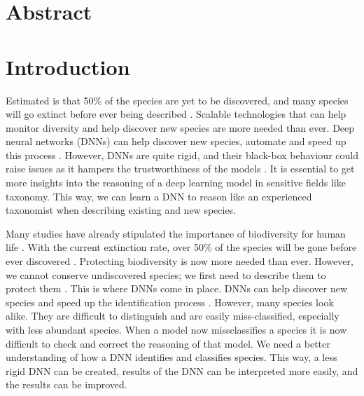 \documentclass[a4paper, 12pt, oneside]{book} %
\begin{document}
\newpage
\thispagestyle{empty}
\section*{Abstract}

\glsaddall\printglossary[type=\acronymtype]\printglossary


\thispagestyle{empty}
\tableofcontents
\thispagestyle{empty}
\listoffigures
\thispagestyle{empty}
\listoftables
\thispagestyle{empty}
\newpage



\renewcommand{\thesection}{\arabic{section}}
\section{Introduction}

Estimated is that 50\% of the species are yet to be discovered, and many species will go extinct before ever being described \autocite{lees_species_2015}.
Scalable technologies that can help monitor diversity and help discover new species are more needed than ever.
Deep neural networks (DNNs) can help discover new species, automate and speed up this process \autocite{van_horn_inaturalist_2018}.
However, DNNs are quite rigid, and their black-box behaviour could raise issues as it hampers the trustworthiness of the models \autocite{carvalho_machine_2019}.
It is essential to get more insights into the reasoning of a deep learning model in sensitive fields like taxonomy.
This way, we can learn a DNN to reason like an experienced taxonomist when describing existing and new species.

Many studies have already stipulated the importance of biodiversity for human life \autocite{pimentel_economic_1997, gowdy_value_1997, raffaelli_links_2010, joppa_biodiversity_2011, pimm_how_2018}.
With the current extinction rate, over 50\% of the species will be gone before ever discovered \autocite{lees_species_2015}.
Protecting biodiversity is now more needed than ever.
However, we cannot conserve undiscovered species; we first need to describe them to protect them \autocite{joppa_biodiversity_2011}.
This is where DNNs come in place.
DNNs can help discover new species and speed up the identification process \autocite{van_horn_inaturalist_2018}.
However, many species look alike.
They are difficult to distinguish and are easily miss-classified, especially with less abundant species.
When a model now missclassifies a species it is now difficult to check and correct the reasoning of that model.
We need a better understanding of how a DNN identifies and classifies species. 
This way, a less rigid DNN can be created, results of the DNN can be interpreted more easily, and the results can be improved.
\end{document}
